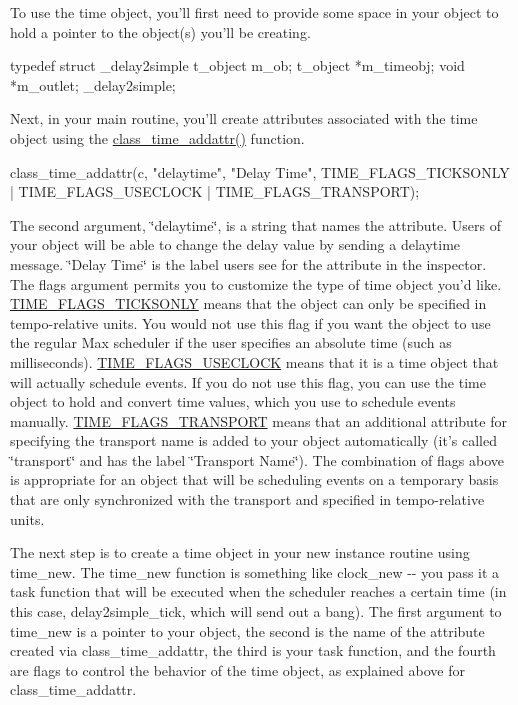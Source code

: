 To use the time object, you'll first need to provide some space in your object to hold a pointer to the object(s) you'll be creating.


\begin{DoxyCode}
    typedef struct _delay2simple
    {
        t_object m_ob;
        t_object *m_timeobj;
        void *m_outlet;
    } _delay2simple;
\end{DoxyCode}


Next, in your main routine, you'll create attributes associated with the time object using the \hyperlink{group__time_ga95e5b2330715823c8a609ccd500aa361}{class\_\-time\_\-addattr()} function. 
\begin{DoxyCode}
        class_time_addattr(c, "delaytime", "Delay Time", TIME_FLAGS_TICKSONLY | 
      TIME_FLAGS_USECLOCK | TIME_FLAGS_TRANSPORT);
\end{DoxyCode}


The second argument, \char`\"{}delaytime\char`\"{}, is a string that names the attribute. Users of your object will be able to change the delay value by sending a delaytime message. \char`\"{}Delay Time\char`\"{} is the label users see for the attribute in the inspector. The flags argument permits you to customize the type of time object you'd like. \hyperlink{group__time_gga99fb83031ce9923c84392b4e92f956b5af93981eb3922895394877d099323a2e8}{TIME\_\-FLAGS\_\-TICKSONLY} means that the object can only be specified in tempo-\/relative units. You would not use this flag if you want the object to use the regular Max scheduler if the user specifies an absolute time (such as milliseconds). \hyperlink{group__time_gga99fb83031ce9923c84392b4e92f956b5a91f2cee835f5cf871a657101b6ff7b4e}{TIME\_\-FLAGS\_\-USECLOCK} means that it is a time object that will actually schedule events. If you do not use this flag, you can use the time object to hold and convert time values, which you use to schedule events manually. \hyperlink{group__time_gga99fb83031ce9923c84392b4e92f956b5a7ddd9e0fa3dc6a7b346fc3dcee5c5c81}{TIME\_\-FLAGS\_\-TRANSPORT} means that an additional attribute for specifying the transport name is added to your object automatically (it's called \char`\"{}transport\char`\"{} and has the label \char`\"{}Transport Name\char`\"{}). The combination of flags above is appropriate for an object that will be scheduling events on a temporary basis that are only synchronized with the transport and specified in tempo-\/relative units.

The next step is to create a time object in your new instance routine using time\_\-new. The time\_\-new function is something like clock\_\-new -\/-\/ you pass it a task function that will be executed when the scheduler reaches a certain time (in this case, delay2simple\_\-tick, which will send out a bang). The first argument to time\_\-new is a pointer to your object, the second is the name of the attribute created via class\_\-time\_\-addattr, the third is your task function, and the fourth are flags to control the behavior of the time object, as explained above for class\_\-time\_\-addattr.

